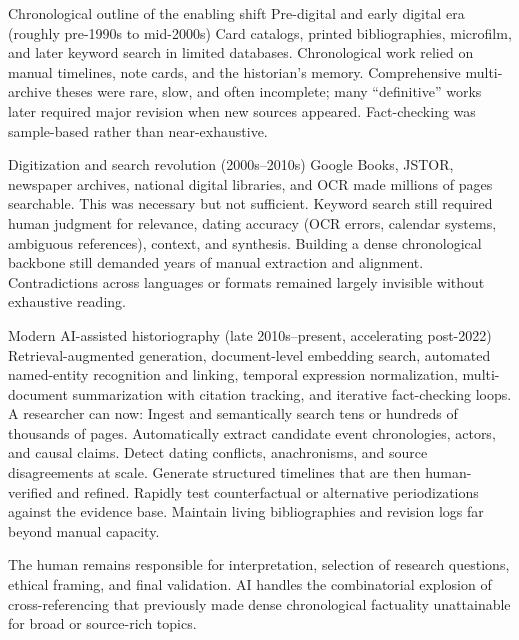 Chronological outline of the enabling shift
Pre-digital and early digital era (roughly pre-1990s to mid-2000s)  
   Card catalogs, printed bibliographies, microfilm, and later keyword search in limited databases. Chronological work relied on manual timelines, note cards, and the historian’s memory. Comprehensive multi-archive theses were rare, slow, and often incomplete; many “definitive” works later required major revision when new sources appeared. Fact-checking was sample-based rather than near-exhaustive.

Digitization and search revolution (2000s–2010s)  
   Google Books, JSTOR, newspaper archives, national digital libraries, and OCR made millions of pages searchable. This was necessary but not sufficient. Keyword search still required human judgment for relevance, dating accuracy (OCR errors, calendar systems, ambiguous references), context, and synthesis. Building a dense chronological backbone still demanded years of manual extraction and alignment. Contradictions across languages or formats remained largely invisible without exhaustive reading.

Modern AI-assisted historiography (late 2010s–present, accelerating post-2022)  
   Retrieval-augmented generation, document-level embedding search, automated named-entity recognition and linking, temporal expression normalization, multi-document summarization with citation tracking, and iterative fact-checking loops. A researcher can now:
   Ingest and semantically search tens or hundreds of thousands of pages.
   Automatically extract candidate event chronologies, actors, and causal claims.
   Detect dating conflicts, anachronisms, and source disagreements at scale.
   Generate structured timelines that are then human-verified and refined.
   Rapidly test counterfactual or alternative periodizations against the evidence base.
   Maintain living bibliographies and revision logs far beyond manual capacity.

   The human remains responsible for interpretation, selection of research questions, ethical framing, and final validation. AI handles the combinatorial explosion of cross-referencing that previously made dense chronological factuality unattainable for broad or source-rich topics.

